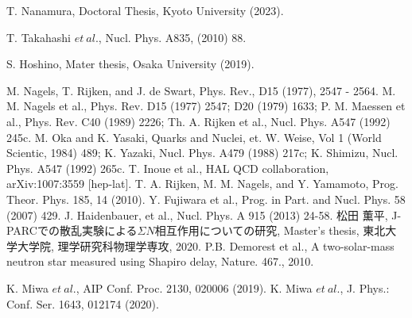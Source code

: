 \begin{thebibliography}{99}
%

T. Nanamura, Doctoral Thesis, Kyoto University (2023).


T. Takahashi $et\ al.$, Nucl. Phys. A835, (2010) 88.
%

S. Hoshino, Mater thesis, Osaka University (2019).





M. Nagels, T. Rijken, and J. de Swart, Phys. Rev., D15 (1977), 2547 - 2564.
M. M. Nagels et al., Phys. Rev. D15 (1977) 2547; D20 (1979) 1633; P. M. Maessen et al., Phys. Rev. C40 (1989) 2226; Th. A. Rijken et al., Nucl. Phys. A547 (1992) 245c.
M. Oka and K. Yasaki, Quarks and Nuclei, et. W. Weise, Vol 1 (World Scientic, 1984) 489; K. Yazaki, Nucl. Phys. A479 (1988) 217c; K. Shimizu, Nucl. Phys. A547 (1992) 265c.
T. Inoue et al., HAL QCD collaboration, arXiv:1007:3559 [hep-lat].
T. A. Rijken, M. M. Nagels, and Y. Yamamoto, Prog. Theor. Phys. 185, 14 (2010).
Y. Fujiwara et al., Prog. in Part. and Nucl. Phys. 58 (2007) 429.
J. Haidenbauer, et al., Nucl. Phys. A 915 (2013) 24-58.
松田 薫平, J-PARCでの散乱実験による$\Sigma N$相互作用についての研究, Master's thesis, 東北大学大学院, 理学研究科物理学専攻, 2020.
P.B. Demorest et al., A two-solar-mass neutron star measured using Shapiro delay, Nature. 467., 2010.


K. Miwa $et\ al.$, AIP Conf. Proc. 2130, 020006 (2019).
K. Miwa $et\ al.$, J. Phys.: Conf. Ser. 1643, 012174 (2020).






\end{thebibliography}
